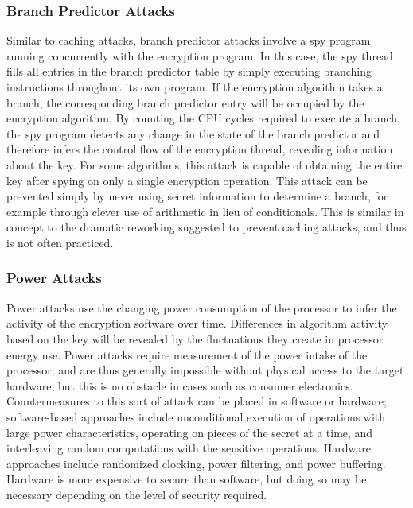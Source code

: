 \documentclass[times, 10pt,twocolumn]{article}
\begin{document}
\subsubsection{Branch Predictor Attacks}
Similar to caching attacks, branch predictor attacks involve a spy program running concurrently with the encryption program.  In this case, the spy thread fills all entries in the branch predictor table by simply executing branching instructions throughout its own program. If the encryption algorithm takes a branch, the corresponding branch predictor entry will be occupied by the encryption algorithm. By counting the CPU cycles required to execute a branch, the spy program detects any change in the state of the branch predictor and therefore infers the control flow of the encryption thread, revealing information about the key.  For some algorithms, this attack is capable of obtaining the entire key after spying on only a single encryption operation\cite{branchpredict}.  This attack can be prevented simply by never using secret information to determine a branch, for example through clever use of arithmetic in lieu of conditionals.  This is similar in concept to the dramatic reworking suggested to prevent caching attacks, and thus is not often practiced.

\subsubsection{Power Attacks}
Power attacks use the changing power consumption of the processor to infer the activity of the encryption software over time.  Differences in algorithm activity based on the key will be revealed by the fluctuations they create in processor energy use.  Power attacks require measurement of the power intake of the processor, and are thus generally impossible without physical access to the target hardware, but this is no obstacle in cases such as consumer electronics.  Countermeasures to this sort of attack can be placed in software or hardware; software-based approaches include unconditional execution of operations with large power characteristics, operating on pieces of the secret at a time, and interleaving random computations with the sensitive operations.  Hardware approaches include randomized clocking, power filtering, and power buffering.  Hardware is more expensive to secure than software, but doing so may be necessary depending on the level of security required.\cite{mmthesis}
\end{document}

